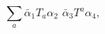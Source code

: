 \begin{equation}
\sum_a  \bar \alpha_1 T_a \alpha_2\,\, \bar \alpha_3 T^a \alpha_4,
\end{equation}

